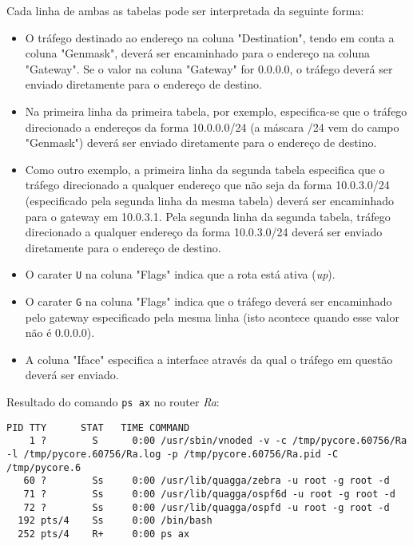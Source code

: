 Cada linha de ambas as tabelas pode ser interpretada da seguinte forma:

\begin{itemize}

  \item O tráfego destinado ao endereço na coluna "Destination", tendo em conta
  a coluna "Genmask", deverá ser encaminhado para o endereço na coluna
  "Gateway". Se o valor na coluna "Gateway" for 0.0.0.0, o tráfego deverá ser
  enviado diretamente para o endereço de destino.

  \item Na primeira linha da primeira tabela, por exemplo, especifica-se que o
  tráfego direcionado a endereços da forma 10.0.0.0/24 (a máscara /24 vem do
  campo "Genmask") deverá ser enviado diretamente para o endereço de destino.

  \item Como outro exemplo, a primeira linha da segunda tabela especifica que o
  tráfego direcionado a qualquer endereço que não seja da forma 10.0.3.0/24
  (especificado pela segunda linha da mesma tabela) deverá ser encaminhado para
  o gateway em 10.0.3.1. Pela segunda linha da segunda tabela, tráfego
  direcionado a qualquer endereço da forma 10.0.3.0/24 deverá ser enviado
  diretamente para o endereço de destino.

  \item O carater \texttt{U} na coluna "Flags" indica que a rota está ativa
  (\emph{up}).

  \item O carater \texttt{G} na coluna "Flags" indica que o tráfego deverá ser
  encaminhado pelo gateway especificado pela mesma linha (isto acontece quando
  esse valor não é 0.0.0.0).

  \item A coluna "Iface" especifica a interface através da qual o tráfego em
  questão deverá ser enviado.

\end{itemize}


Resultado do comando \texttt{ps ax} no router \emph{Ra}:

\begin{Verbatim}[fontsize=\scriptsize]
  PID TTY      STAT   TIME COMMAND
    1 ?        S      0:00 /usr/sbin/vnoded -v -c /tmp/pycore.60756/Ra -l /tmp/pycore.60756/Ra.log -p /tmp/pycore.60756/Ra.pid -C /tmp/pycore.6
   60 ?        Ss     0:00 /usr/lib/quagga/zebra -u root -g root -d
   71 ?        Ss     0:00 /usr/lib/quagga/ospf6d -u root -g root -d
   72 ?        Ss     0:00 /usr/lib/quagga/ospfd -u root -g root -d
  192 pts/4    Ss     0:00 /bin/bash
  252 pts/4    R+     0:00 ps ax
\end{Verbatim}

